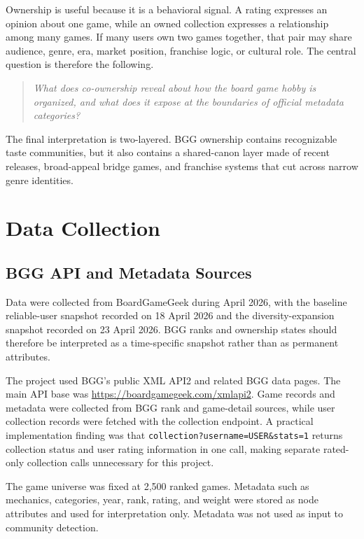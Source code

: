 \documentclass[10pt,twocolumn]{article}
\begin{document}
Ownership is useful because it is a behavioral signal. A rating expresses an opinion about one game, while an owned collection expresses a relationship among many games. If many users own two games together, that pair may share audience, genre, era, market position, franchise logic, or cultural role. The central question is therefore the following.

\begin{quote}
\emph{What does co-ownership reveal about how the board game hobby is organized, and what does it expose at the boundaries of official metadata categories?}
\end{quote}

The final interpretation is two-layered. BGG ownership contains recognizable taste communities, but it also contains a shared-canon layer made of recent releases, broad-appeal bridge games, and franchise systems that cut across narrow genre identities.

\section{Data Collection}

\subsection{BGG API and Metadata Sources}

Data were collected from BoardGameGeek during April 2026, with the baseline reliable-user snapshot recorded on 18 April 2026 and the diversity-expansion snapshot recorded on 23 April 2026. BGG ranks and ownership states should therefore be interpreted as a time-specific snapshot rather than as permanent attributes.

The project used BGG's public XML API2 and related BGG data pages. The main API base was \url{https://boardgamegeek.com/xmlapi2}. Game records and metadata were collected from BGG rank and game-detail sources, while user collection records were fetched with the collection endpoint. A practical implementation finding was that \texttt{collection?username=USER\&stats=1} returns collection status and user rating information in one call, making separate rated-only collection calls unnecessary for this project.

The game universe was fixed at 2,500 ranked games. Metadata such as mechanics, categories, year, rank, rating, and weight were stored as node attributes and used for interpretation only. Metadata was not used as input to community detection.
\end{document}
